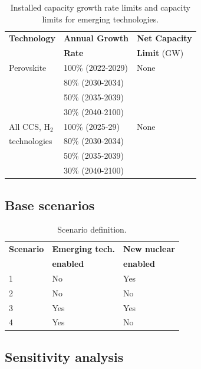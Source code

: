 \begin{table}[!ht]
	\caption{Installed capacity growth rate limits and capacity limits for emerging technologies.}
	\vspace{0.1in}
	\begin{tabularx}{\textwidth}{p{} p{} p{} }
		\hline
\textbf{Technology} & \textbf{Annual Growth} & \textbf{Net Capacity} \\
  & \textbf{Rate}  & \textbf{Limit} (GW) \\
\hline
Perovskite & 100\% (2022-2029) & None \\
 & 80\% (2030-2034) &  \\
 & 50\% (2035-2039) & \\
 & 30\% (2040-2100) & \\
All CCS, H$_2$ & 100\% (2025-29) & None \\
technologies & 80\% (2030-2034) &  \\
 & 50\% (2035-2039) & \\
 & 30\% (2040-2100) & \\
\hline 
\end{tabularx}
\label{emerging-gro}
\end{table}

\subsection{Base scenarios}

\begin{table}[!ht]
	\caption{Scenario definition.}
	\vspace{0.1in}
	\begin{tabularx}{\textwidth}{p{} p{} p{}}
\hline 
\textbf{Scenario}& \textbf{Emerging tech.} & \textbf{New nuclear} \\
                 & \textbf{enabled} & \textbf{enabled} \\
                  \hline
1               &   No       &      Yes     \\ 
2               &  No       &         No       \\ 
3               &   Yes     &      Yes     \\ 
4               &   Yes     &         No       \\

\hline
	\end{tabularx}
\label{scen-table}
\end{table}



\subsection{Sensitivity analysis}

